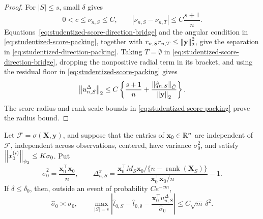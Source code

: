 \begin{proof}
For $|S|\le s$, small $\delta$ gives
\[
 0<c\le\nu_{n,S}\le C,
 \qquad
 |\nu_{n,S}-\nu_{n,T}|\le C\frac{s+1}{n}.
\]
Equations~\eqref{eq:studentized-score-direction-bridge} and
the angular condition in \eqref{eq:studentized-score-packing}, together with
$r_{n,S}r_{n,T}\le\left\lVert \mathbf y\right\rVert_2^2$, give the separation in
\eqref{eq:studentized-direction-packing}.  Taking $T=\emptyset$ in
\eqref{eq:studentized-score-direction-bridge}, dropping the nonpositive
radial term in its bracket, and using
the residual floor in \eqref{eq:studentized-score-packing} gives
\[
 \left\lVert u_{n,S}^{\Delta}\right\rVert_2
 \le C\left\{\frac{s+1}{n}
 +\frac{\left\lVert \hat q_{n,S}\right\rVert_{\hat C}}{\left\lVert \mathbf y\right\rVert_2}\right\}.
\]
The score-radius and rank-scale bounds in
\eqref{eq:studentized-score-packing} prove the radius bound.
\end{proof}

\begin{lemma}
\label{lem:conditional-studentized-direction}
Let $\mathcal F=\sigma(\mathbf X,\mathbf y)$, and suppose that the entries
of $\mathbf x_0\in\mathbb R^n$ are independent of $\mathcal F$, independent
across observations, centered, have variance $\sigma_0^2$, and satisfy
$\left\lVert x_0^{(i)}\right\rVert_{\psi_2}\le K\sigma_0$.  Put
\begin{equation}\label{eq:conditional-treatment-scale}
        \hat\sigma_0^2=\frac{\mathbf x_0^\top\mathbf x_0}{n},
        \qquad
        \Delta^x_{n,S}
        =\frac{\mathbf x_0^\top M_S\mathbf x_0/
        \{n-\operatorname{rank}(\mathbf X_S)\}}
        {\mathbf x_0^\top\mathbf x_0/n}-1.
\end{equation}
If $\delta\le\delta_0$, then, outside an event of probability $Ce^{-cm}$,
\begin{equation}\label{eq:conditional-studentized-direction-reduction}
 \hat\sigma_0\asymp\sigma_0,
 \qquad
 \max_{|S|=s}\left|
 \hat t_{0,S}-\hat t_{0,\emptyset}
 -\frac{\mathbf x_0^\top u_{n,S}^{\Delta}}{\hat\sigma_0}
 \right|
 \le C\sqrt m\,\delta^2.
\end{equation}
\end{lemma}

